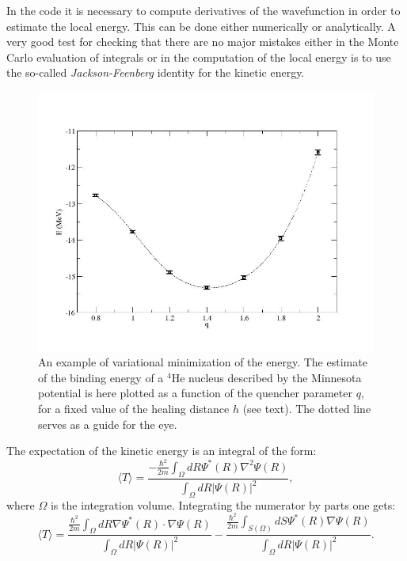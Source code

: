 In the code it is necessary to compute derivatives of the wavefunction in order to estimate the local energy. This can be done either numerically or analytically. A very good test for checking that there are no major mistakes either in the Monte Carlo evaluation of integrals or in the computation of the local energy is to use the so-called {\it Jackson-Feenberg} identity for the kinetic energy.
\begin{figure}
	\begin{center}
		\includegraphics[scale=0.5]{Chapter9-figures/qvar.jpg}
	\end{center}
	\caption{An example of variational minimization of the energy. The estimate of the binding energy of a $^4$He nucleus described by the Minnesota potential is here plotted as a function of the quencher parameter $q$, for a fixed value of the healing distance $h$ (see text). The dotted line serves as a guide for the eye.}
	\label{fig.var}
\end{figure}
The expectation of the kinetic energy is an integral of the form:
\begin{equation}
\label{T_PB}
\langle T\rangle = \frac{\displaystyle-\frac{\hbar^2}{2m}\int_\Omega dR \Psi^*(R)\nabla^2\Psi(R)}{\displaystyle\int_\Omega dR |\Psi(R)|^2},
\end{equation}
where $\Omega$ is the integration volume. Integrating the numerator by parts one gets:
\begin{equation}
\langle T\rangle = \frac{\displaystyle\frac{\hbar^2}{2m}\int_\Omega dR \nabla\Psi^*(R)\cdot\nabla\Psi(R)}{\displaystyle\int_\Omega dR |\Psi(R)|^2} -\frac{\displaystyle\frac{\hbar^2}{2m}\int_{S(\Omega)} dS\Psi^*(R)\nabla\Psi(R) }{\displaystyle\int_\Omega dR |\Psi(R)|^2}.
\end{equation}
